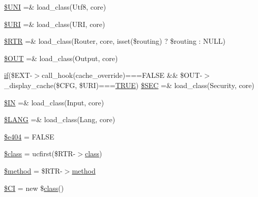 \begin{DoxyCompactItemize}
\mbox{\hyperlink{_code_igniter_8php_a2060dabd8d00b5b0539bd041bf450924}{\$\+U\+NI}} =\& load\+\_\+class(\textquotesingle{}Utf8\textquotesingle{}, \textquotesingle{}core\textquotesingle{})
\item 
\mbox{\hyperlink{_code_igniter_8php_a630d83d898b39ad4568906284f7f5336}{\$\+U\+RI}} =\& load\+\_\+class(\textquotesingle{}U\+RI\textquotesingle{}, \textquotesingle{}core\textquotesingle{})
\item 
\mbox{\hyperlink{_code_igniter_8php_a4d6c9285c8483e4708a57a4128fc95f3}{\$\+R\+TR}} =\& load\+\_\+class(\textquotesingle{}Router\textquotesingle{}, \textquotesingle{}core\textquotesingle{}, isset(\$routing) ? \$routing \+: N\+U\+LL)
\item 
\mbox{\hyperlink{_code_igniter_8php_ad437402616c81c82c746f09854b23729}{\$\+O\+UT}} =\& load\+\_\+class(\textquotesingle{}Output\textquotesingle{}, \textquotesingle{}core\textquotesingle{})
\item 
\mbox{\hyperlink{_code_igniter_8php_a68ca62d45495d195f67d234bdafb1d1f}{if}}(\$E\+XT-\/$>$call\+\_\+hook(\textquotesingle{}cache\+\_\+override\textquotesingle{})===F\+A\+L\+SE \&\& \$O\+UT-\/$>$\+\_\+display\+\_\+cache(\$C\+FG, \$U\+RI)===\mbox{\hyperlink{constants_8php_ae04a3efe6aa42044f803ee90c2277846}{T\+R\+UE}}) \mbox{\hyperlink{_code_igniter_8php_a4b7abe119386c359d42b2eddeb8383b8}{\$\+S\+EC}} =\& load\+\_\+class(\textquotesingle{}Security\textquotesingle{}, \textquotesingle{}core\textquotesingle{})
\item 
\mbox{\hyperlink{_code_igniter_8php_a66d076d48aff75a01bb726f5bdd94d46}{\$\+IN}} =\& load\+\_\+class(\textquotesingle{}Input\textquotesingle{}, \textquotesingle{}core\textquotesingle{})
\item 
\mbox{\hyperlink{_code_igniter_8php_afab4eb732acc05cebf41e0afce18681c}{\$\+L\+A\+NG}} =\& load\+\_\+class(\textquotesingle{}Lang\textquotesingle{}, \textquotesingle{}core\textquotesingle{})
\item 
\mbox{\hyperlink{_code_igniter_8php_a20b89fa011927fc498a4a665fa44d061}{\$e404}} = F\+A\+L\+SE
\item 
\mbox{\hyperlink{_code_igniter_8php_a252ba022809910ea710a068fc1bab657}{\$class}} = ucfirst(\$R\+TR-\/$>$\mbox{\hyperlink{waiter_2olaporan_8php_a185c73c6507391d1eb38c776b68ce96d}{class}})
\item 
\mbox{\hyperlink{_code_igniter_8php_a12661b2fc0f57f97e30a1620889ce9c6}{\$method}} = \$R\+TR-\/$>$\mbox{\hyperlink{waiter_2order_8php_ac0cc2006fd803bf741cbbe406e3f6361}{method}}
\item 
\mbox{\hyperlink{_code_igniter_8php_ae0314d046ddf7fcfaec03222977427d3}{\$\+CI}} = new \$\mbox{\hyperlink{waiter_2olaporan_8php_a185c73c6507391d1eb38c776b68ce96d}{class}}()
\end{DoxyCompactItemize}


